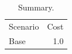 \begin{table}
  \caption{Summary.}\label{tab:summary}
  \begin{tabular}{lr}
    Scenario & Cost \\
    Base & 1.0 \\
  \end{tabular}
\end{table}
